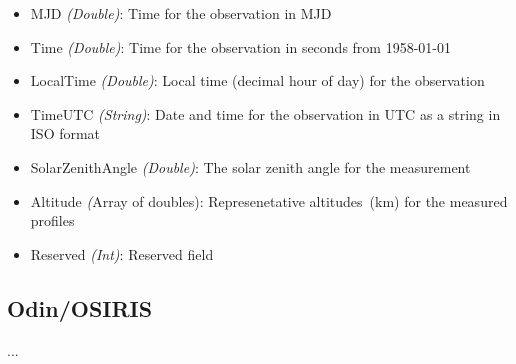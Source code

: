 \begin{itemize}
\begin{itemize}
            \item MJD \emph{(Double)}: Time for the observation in MJD
            \item Time \emph{(Double)}: Time for the observation in seconds
                from 1958-01-01
            \item LocalTime \emph{(Double)}: Local time (decimal hour of day)
                for the observation
            \item TimeUTC \emph{(String)}: Date and time for the observation in
                UTC as a string in ISO format
            \item SolarZenithAngle \emph{(Double)}: The solar zenith angle for
                the measurement
            \item Altitude \emph({Array of doubles}): Represenetative
                altitudes~(km) for the measured profiles
            \item Reserved \emph{(Int)}: Reserved field
        \end{itemize}
\end{itemize}


\subsection{Odin/OSIRIS}
...


